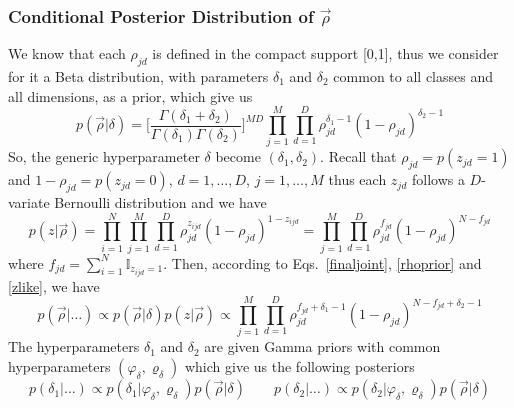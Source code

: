 \documentclass[journal,10pt]{elsart}
\begin{document}
\subsubsection{Conditional Posterior Distribution of $\vec{\rho}$}
We know that each $\rho_{jd}$ is defined in the compact support [0,1], thus we consider for it a Beta distribution, with parameters $\delta_1$ and $\delta_2$ common to all classes and all dimensions, as a prior, which give us
\begin{equation}\label{rhoprior}
p(\vec{\rho}|\delta)=\bigg[\frac{\Gamma(\delta_1+\delta_2)}{\Gamma(\delta_1)\Gamma(\delta_2)}\bigg]^{MD}\prod_{j=1}^{M}\prod_{d=1}^{D}
\rho_{jd}^{\delta_1-1}(1-\rho_{jd})^{\delta_2-1}
\end{equation}
So, the generic hyperparameter $\delta$ become $(\delta_1,\delta_2)$.
Recall that $\rho_{jd}=p(z_{jd}=1)$ and $1-\rho_{jd}=p(z_{jd}=0)$,  $d=1,\ldots,D$, $j=1,\ldots,M$ thus each $z_{jd}$ follows a $D$-variate Bernoulli distribution and we have
\begin{equation}\label{zlike}
p(z|\vec{\rho})=\prod_{i=1}^N\prod_{j=1}^M\prod_{d=1}^D \rho_{jd}^{z_{ijd}} (1-\rho_{jd})^{1-z_{ijd}}=\prod_{j=1}^M\prod_{d=1}^D \rho_{jd}^{f_{jd}} (1-\rho_{jd})^{N-f_{jd}}
\end{equation}
where $f_{jd}=\sum_{i=1}^N \mathbb{I}_{z_{ijd}=1}$. Then, according to Eqs.~\ref{finaljoint}, \ref{rhoprior} and \ref{zlike}, we have
\begin{equation}\label{rhoposterior}
p(\vec{\rho}|\ldots)\propto p(\vec{\rho}|\delta)p(z|\vec{\rho})\propto \prod_{j=1}^{M}\prod_{d=1}^{D}
\rho_{jd}^{f_{jd}+\delta_1-1}(1-\rho_{jd})^{N-f_{jd}+\delta_2-1}
\end{equation}
The hyperparameters $\delta_1$ and $\delta_2$ are given Gamma priors with common hyperparameters $(\varphi_{\delta},\varrho_{\delta})$ which give us the following posteriors
\begin{equation}\label{delta1posterior}
p(\delta_1|\ldots) \propto p(\delta_1|\varphi_{\delta},\varrho_{\delta})p(\vec{\rho}|\delta) \qquad
p(\delta_2|\ldots) \propto p(\delta_2|\varphi_{\delta},\varrho_{\delta})p(\vec{\rho}|\delta)
\end{equation}
\end{document}
